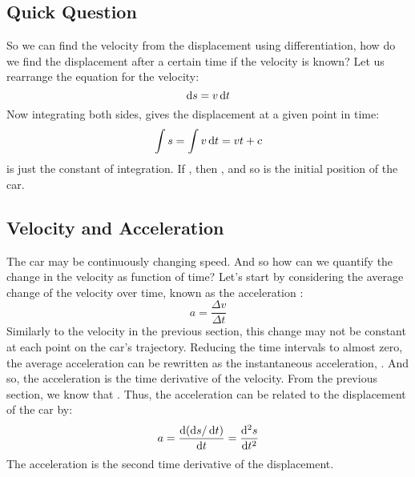 \subsection*{Quick Question}
So we can find the velocity from the displacement using differentiation, how do we find the displacement after a certain time if the velocity is known? Let us rearrange the equation for the velocity:
 \begin{equation}
\operatorname{d}\! s = v \operatorname{d}\! t \label{inst_s}
\end{equation}
Now integrating both sides, gives the displacement at a given point in time:
  \begin{equation}
\int s = \int v \operatorname{d}\! t = vt + c
\end{equation}
 is just the constant of integration. If , then , and so  is the initial position of the car.

\subsection{Velocity and Acceleration}
The car may be continuously changing speed. And so how can we quantify the change in the velocity as function of time? Let's start by considering the average change of the velocity over time, known as the acceleration :
\begin{equation}
a = \frac{\Delta v}{\Delta t} 
\end{equation}
Similarly to the velocity in the previous section, this change may not be constant at each point on the car's trajectory. Reducing the time intervals to almost zero, the average acceleration can be rewritten as the instantaneous acceleration, . And so, the acceleration is the time derivative of the velocity. From the previous section, we know that . Thus, the acceleration can be related to the displacement of the car by:
\begin{equation}
a = \frac{\operatorname{d}\! \left(\operatorname{d}\! s/ \operatorname{d}\! t\right)}{\operatorname{d}\! t} = \frac{\operatorname{d}\!^2 s}{\operatorname{d}\! t^2} 
\end{equation}
 The acceleration is the second time derivative of the displacement. 
